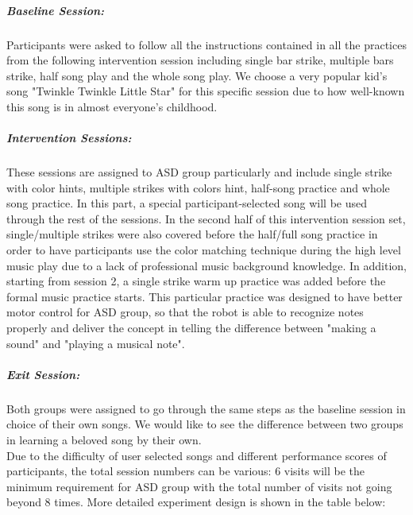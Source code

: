 \subparagraph{Baseline Session: }Participants were asked to follow all the 
instructions contained in all the practices from the following intervention session 
including single bar strike, multiple bars strike, half song play and the whole
song play. We choose a very popular kid's song "Twinkle Twinkle Little Star" 
for this specific session due to how well-known this song is in almost 
everyone's childhood.\\

\subparagraph{Intervention Sessions: }These sessions are assigned to ASD group
particularly and include single strike with color hints, multiple strikes with
colors hint, half-song practice and whole song practice. In this part, a special
participant-selected song will be used through the rest of the sessions. In the second
half of this intervention session set, single/multiple strikes were also covered
before the half/full song practice in order to have participants use the
color matching technique during the high level music play due to a lack of professional
music background knowledge. In addition, starting from session 2, a single strike
warm up practice was added before the formal music practice starts. This particular
practice was designed to have better motor control for ASD group, so that
the robot is able to recognize notes properly and deliver the concept in telling the
difference between "making a sound" and "playing a musical note". \\

\subparagraph{Exit Session: }Both groups were assigned to go through the same steps
as the baseline session in choice of their own songs. We would like to see the 
difference between two groups in learning a beloved song by their own.\\

Due to the difficulty of user selected songs and different performance scores of
participants, the total session numbers can be various: 6 visits will be the minimum
requirement for ASD group with the total number of visits not going beyond 8 times. More detailed 
experiment design is shown in the table below:\\

